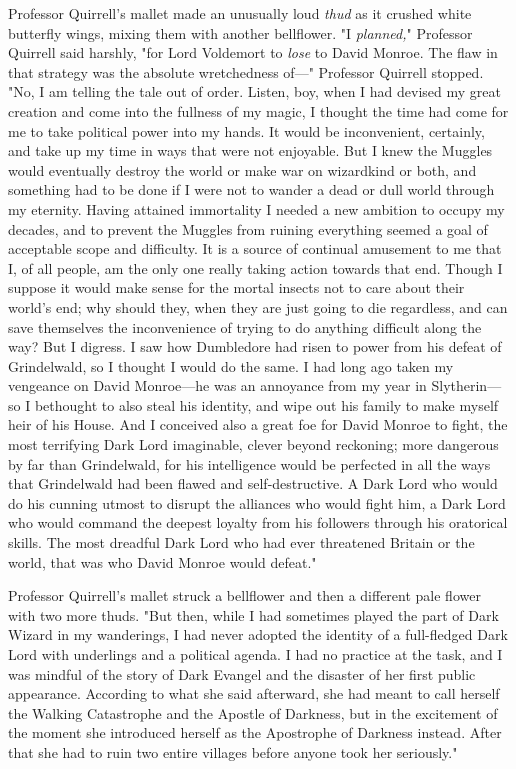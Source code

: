 Professor Quirrell's mallet made an unusually loud \emph{thud} as it crushed
white butterfly wings, mixing them with another bellflower. "I \emph{planned,}"
Professor Quirrell said harshly, "for Lord Voldemort to \emph{lose} to David
Monroe. The flaw in that strategy was the absolute wretchedness of\mbox{---}"
Professor Quirrell stopped. "No, I am telling the tale out of order. Listen,
boy, when I had devised my great creation and come into the fullness of my
magic, I thought the time had come for me to take political power into my
hands. It would be inconvenient, certainly, and take up my time in ways that
were not enjoyable. But I knew the Muggles would eventually destroy the world
or make war on wizardkind or both, and something had to be done if I were not to
wander a dead or dull world through my eternity. Having attained immortality I
needed a new ambition to occupy my decades, and to prevent the Muggles from
ruining everything seemed a goal of acceptable scope and difficulty. It is a
source of continual amusement to me that I, of all people, am the only one
really taking action towards that end. Though I suppose it would make sense for
the mortal insects not to care about their world's end; why should they, when
they are just going to die regardless, and can save themselves the
inconvenience of trying to do anything difficult along the way? But I digress.
I saw how Dumbledore had risen to power from his defeat of Grindelwald, so I
thought I would do the same. I had long ago taken my vengeance on David
Monroe---he was an annoyance from my year in Slytherin---so I bethought to also
steal his identity, and wipe out his family to make myself heir of his House.
And I conceived also a great foe for David Monroe to fight, the most terrifying
Dark Lord imaginable, clever beyond reckoning; more dangerous by far than
Grindelwald, for his intelligence would be perfected in all the ways that
Grindelwald had been flawed and self-destructive. A Dark Lord who would do his
cunning utmost to disrupt the alliances who would fight him, a Dark Lord who
would command the deepest loyalty from his followers through his oratorical
skills. The most dreadful Dark Lord who had ever threatened Britain or the
world, that was who David Monroe would defeat."

Professor Quirrell's mallet struck a bellflower and then a different pale
flower with two more thuds. "But then, while I had sometimes played the part of
Dark Wizard in my wanderings, I had never adopted the identity of a
full-fledged Dark Lord with underlings and a political agenda. I had no
practice at the task, and I was mindful of the story of Dark Evangel and the
disaster of her first public appearance. According to what she said afterward,
she had meant to call herself the Walking Catastrophe and the Apostle of
Darkness, but in the excitement of the moment she introduced herself as the
Apostrophe of Darkness instead. After that she had to ruin two entire villages
before anyone took her seriously."

